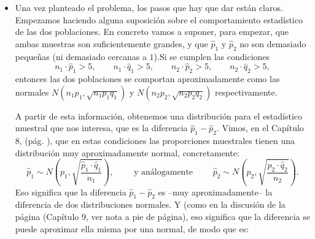 \begin{itemize}
\begin{enumerate}
        \end{enumerate}
    \item Una vez planteado el problema, los pasos que hay que dar están claros. Empezamos haciendo alguna suposición sobre el comportamiento estadístico de las dos poblaciones. En concreto vamos a suponer, para empezar, que ambas muestras son suficientemente grandes, y que $\hat p_1$ y $\hat p_2$ no son demasiado pequeñas (ni demasiado cercanas a $1$).{\sf Si se cumplen las condiciones
        \[n_1\cdot\hat p_1>5,\qquad n_1\cdot\hat q_1>5,\qquad  n_2\cdot\hat p_2>5,\qquad n_2\cdot\hat q_2>5,\]
        entonces las dos poblaciones se comportan aproximadamente como las normales $N(n_1p_1,\sqrt{n_1p_1q_1})$ y $N(n_2p_2,\sqrt{n_2p_2q_2})$ respectivamente.}

        A partir de esta información, obtenemos una distribución para el estadístico muestral que nos interesa, que es la diferencia $\hat p_1-\hat p_2$. Vimos, en el Capítulo 8, (pág. \pageref{sec:InferenciaEstadisticaSobreProporciones}), que en estas condiciones las proporciones muestrales tienen una distribución muy aproximadamente normal, concretamente:
        \[\hat p_1\sim N\left(p_1,\sqrt{\dfrac{\hat p_1\cdot\hat q_1}{n_1}}\right),\qquad\mbox{ y análogamente }\qquad \hat p_2\sim N\left(p_2,\sqrt{\dfrac{\hat p_2\cdot\hat q_2}{n_2}}\right).\]
        Eso significa que la diferencia $\hat p_1-\hat p_2$ es --muy aproximadamente-- la diferencia de dos distribuciones normales. Y (como en la discusión de la página \pageref{ObtenerDistribucionCuasivarianzaMuestral} (Capítulo 9, ver nota a pie de página), eso significa que la diferencia se puede aproximar ella misma por una normal, de modo que es:\\[3mm]
        \\[3mm]


\end{itemize}
